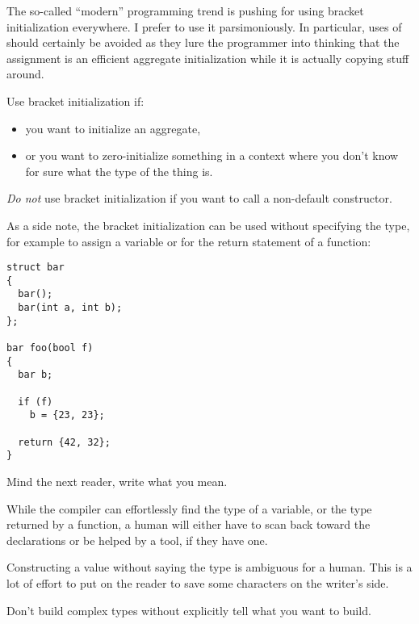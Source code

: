 The so-called ``modern'' \cpp{} programming trend is pushing for using
bracket initialization everywhere. I prefer to use it
parsimoniously. In particular, uses of 
should certainly be avoided as they lure the programmer into thinking
that the assignment is an efficient aggregate initialization while it
is actually copying stuff around.

\begin{guideline}
  Use bracket initialization if:
  \begin{itemize}
  \item you want to initialize an aggregate,
  \item or you want to zero-initialize something in a context where
    you don't know for sure what the type of the thing is.
  \end{itemize}

  \emph{Do not} use bracket initialization if you want to call a
  non-default constructor.
\end{guideline}

As a side note, the bracket initialization can be used without
specifying the type, for example to assign a variable or for the
return statement of a function:

\begin{lstlisting}
struct bar
{
  bar();
  bar(int a, int b);
};

bar foo(bool f)
{
  bar b;

  if (f)
    b = {23, 23};

  return {42, 32};
}
\end{lstlisting}

\begin{guideline}
  Mind the next reader, write what you mean.

  While the compiler can effortlessly find the type of a variable, or
  the type returned by a function, a human will either have to scan
  back toward the declarations or be helped by a tool, if they have
  one.

  Constructing a value without saying the type is ambiguous for a
  human. This is a lot of effort to put on the reader to save some
  characters on the writer's side.

  Don't build complex types without explicitly tell what you want to
  build.
\end{guideline}

